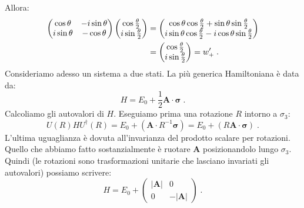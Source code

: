 \documentclass[10pt,a4paper]{report}
\theoremstyle{definition}
\numberwithin{equation}{section}
\newcommand{\adj}[1]{#1^{\dagger}}
\begin{document}
Allora:
\begin{align}
\left(\begin{matrix}
\cos\theta & -i\sin\theta \\
i\sin\theta & -\cos\theta
\end{matrix}\right)\left(\begin{matrix}
\cos\frac{\theta}{2} \\
i\sin\frac{\theta}{2}
\end{matrix}\right) &= \left(
\begin{matrix}
\cos\theta\cos\frac{\theta}{2}+\sin\theta\sin\frac{\theta}{2} \\
i\sin\theta\cos\frac{\theta}{2}-i\cos\theta\sin\frac{\theta}{2}
\end{matrix}\right) \notag \\
&= \left(\begin{matrix}
\cos\frac{\theta}{2} \\
i\sin\frac{\theta}{2}
\end{matrix}\right)=w_+'\;.
\end{align}
Consideriamo adesso un sistema a due stati. La più generica Hamiltoniana è data da:
\begin{equation}
H=E_0+\frac{1}{2}\mathbf{A}\cdot\boldsymbol{\sigma}\;.
\end{equation}
Calcoliamo gli autovalori di $H$. Eseguiamo prima una rotazione $R$ intorno a $\sigma_3$:
\begin{equation}
U(R)H\adj{U}(R)=E_0+(\mathbf{A}\cdot R^{-1}\boldsymbol{\sigma})=E_0+(R\mathbf{A}\cdot\boldsymbol{\sigma})\;.
\end{equation}
L'ultima uguaglianza è dovuta all'invarianza del prodotto scalare per rotazioni. Quello che abbiamo fatto sostanzialmente è ruotare $\mathbf{A}$ posizionandolo lungo $\sigma_3$. Quindi (le rotazioni sono trasformazioni unitarie che lasciano invariati gli autovalori) possiamo scrivere:
\begin{equation}
H=E_0+\left(\begin{matrix}
|\mathbf{A}| & 0 \\
0 & -|\mathbf{A}|
\end{matrix}\right)\;.
\end{equation}
\end{document}
